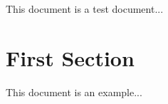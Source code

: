 \documentclass{article}
\begin{document}
This document is a test document...

\section{First Section}
This document is an example...
\end{document}
